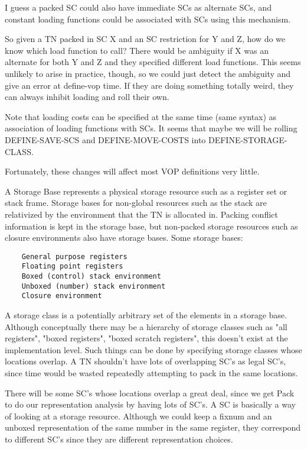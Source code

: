 I guess a packed SC could also have immediate SCs as alternate SCs, and
constant loading functions could be associated with SCs using this mechanism.

So given a TN packed in SC X and an SC restriction for Y and Z, how do we know
which load function to call?  There would be ambiguity if X was an alternate
for both Y and Z and they specified different load functions.  This seems
unlikely to arise in practice, though, so we could just detect the ambiguity
and give an error at define-vop time.  If they are doing something totally
weird, they can always inhibit loading and roll their own.

Note that loading costs can be specified at the same time (same syntax) as
association of loading functions with SCs.  It seems that maybe we will be
rolling DEFINE-SAVE-SCS and DEFINE-MOVE-COSTS into DEFINE-STORAGE-CLASS.

Fortunately, these changes will affect most VOP definitions very little.


A Storage Base represents a physical storage resource such as a register set or
stack frame.  Storage bases for non-global resources such as the stack are
relativized by the environment that the TN is allocated in.  Packing conflict
information is kept in the storage base, but non-packed storage resources such
as closure environments also have storage bases.
Some storage bases:
\begin{verbatim}
    General purpose registers
    Floating point registers
    Boxed (control) stack environment
    Unboxed (number) stack environment
    Closure environment
\end{verbatim}

A storage class is a potentially arbitrary set of the elements in a storage
base.  Although conceptually there may be a hierarchy of storage classes such
as "all registers", "boxed registers", "boxed scratch registers", this doesn't
exist at the implementation level.  Such things can be done by specifying
storage classes whose locations overlap.  A TN shouldn't have lots of
overlapping SC's as legal SC's, since time would be wasted repeatedly
attempting to pack in the same locations.

There will be some SC's whose locations overlap a great deal, since we get Pack
to do our representation analysis by having lots of SC's.  A SC is basically a
way of looking at a storage resource.  Although we could keep a fixnum and an
unboxed representation of the same number in the same register, they correspond
to different SC's since they are different representation choices.

